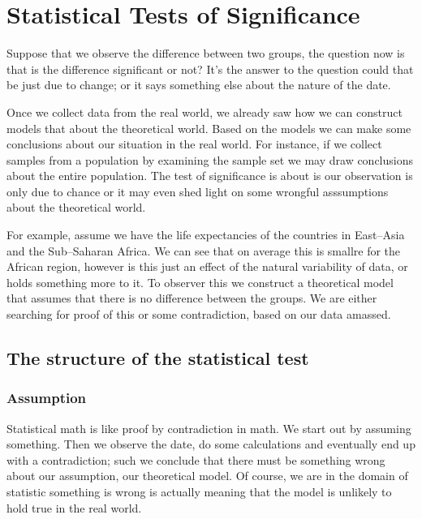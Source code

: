 \chapter*{Statistical Tests of Significance}

\setcounter{section}{0}
\renewcommand*{\theHsection}{ch5.\the\value{section}}

Suppose that we observe the difference between two groups, the question now is
that is the difference significant or not? It's the answer to the question could
that be just due to change; or it says something else about the nature of the
date. 

Once we collect data from the real world, we already saw how we can construct
models that about the theoretical world. Based on the models we can make some
conclusions about our situation in the real world. For instance, if we collect
samples from a population by examining the sample set we may draw conclusions
about the entire population. The test of significance is about is our
observation is only due to chance or it may even shed light on some wrongful
asssumptions about the theoretical world. 

For example, assume we have the life expectancies of the countries in East--Asia
and the Sub--Saharan Africa. We can see that on average this is smallre for the
African region, however is this just an effect of the natural variability of
data, or holds something more to it. To observer this we construct a theoretical
model that assumes that there is no difference between the groups. We are either
searching for proof of this or some contradiction, based on our data amassed.

\section{The structure of the statistical test}

\subsection{Assumption}

Statistical math is like proof by contradiction in math. We start out by
assuming something. Then we observe the date, do some calculations and
eventually end up with a contradiction; such we conclude that there must be
something wrong about our assumption, our theoretical model. Of course, we are
in the domain of statistic something is wrong is actually meaning that the model
is unlikely to hold true in the real world.

